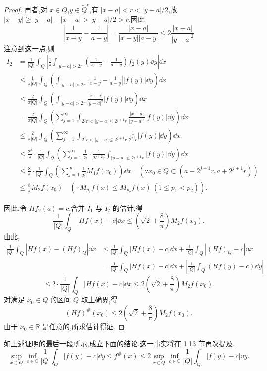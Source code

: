\begin{proof}
再者,对 $x \in Q$,$y \in \tilde{Q}^{c}$,有 $|x - a| < r < |y - a|/2$,故 $|x - y| \geq |y - a| - |x - a| > |y - a|/2 > r$.因此
\begin{equation*}
\left|\frac{1}{x - y} - \frac{1}{a - y}\right| = \frac{|x - a|}{|x - y||a - y|} \leq 2\frac{|x - a|}{|y - a|^{2}}
\end{equation*}
注意到这一点,则
\begin{align*}
I_{2} &= \frac{1}{|Q|}\int_{Q}\left|\frac{1}{\pi}\int_{|y - a| > 2r}\left(\frac{1}{x - y} - \frac{1}{a - y}\right)f_{2}(y)\dd y\right|\dd x \\
&\leq \frac{1}{\pi|Q|}\int_{Q}\left(\int_{|y - a| > 2r}\left|\frac{1}{x - y} - \frac{1}{a - y}\right||f(y)|\dd y\right)\dd x \\
&\leq \frac{2}{\pi|Q|}\int_{Q}\left(\int_{|y - a| > 2r}\frac{|x - a|}{|y - a|^{2}}|f(y)|\dd y\right)\dd x \\
&= \frac{2}{\pi|Q|}\int_{Q}\left(\sum_{j=1}^{\infty}\int_{2^{j}r < |y - a| \leq 2^{j+1}r}\frac{|x - a|}{|y - a|^{2}}|f(y)|\dd y\right)\dd x \\
&\leq \frac{2}{\pi|Q|}\int_{Q}\left(\sum_{j=1}^{\infty}\int_{2^{j}r < |y - a| \leq 2^{j+1}r}\frac{1}{2^{2j}r}|f(y)|\dd y\right)\dd x \\
&\leq \frac{2^{3}}{\pi}\cdot\frac{1}{|Q|}\int_{Q}\left(\sum_{j=1}^{\infty}\frac{1}{2^{j}}\cdot\frac{1}{2^{j+2}r}\int_{|y - a| \leq 2^{j+1}r}|f(y)|\dd y\right)\dd x \\
&\leq \frac{8}{\pi}\cdot\frac{1}{|Q|}\int_{Q}\left(\sum_{j=1}^{\infty}\frac{1}{2^{j}}M_{1}f(x_{0})\right)\dd x \quad (\because x_{0} \in Q \subset (a - 2^{j+1}r, a + 2^{j+1}r)) \\
&\leq \frac{8}{\pi}M_{2}f(x_{0}) \quad (\because M_{p_{1}}f(x) \leq M_{p_{2}}f(x) \ (1 \leq p_{1} < p_{2})).
\end{align*}

因此,令 $Hf_{2}(a) = c$,合并 $I_{1}$ 与 $I_{2}$ 的估计,得
\begin{equation*}
\frac{1}{|Q|}\int_{Q}|Hf(x) - c|\dd x \leq \left(\sqrt{2} + \frac{8}{\pi}\right)M_{2}f(x_{0}).
\end{equation*}
由此,
\begin{align*}
\frac{1}{|Q|}\int_{Q}|Hf(x) - (Hf)_{Q}|\dd x&\leq \frac{1}{|Q|}\int_{Q}|Hf(x) - c|\dd x + \frac{1}{|Q|}\int_{Q}|(Hf)_{Q} - c|\dd x  \\
&= \frac{1}{|Q|}\int_{Q}|Hf(x) - c|\dd x + \left|\frac{1}{|Q|}\int_{Q}(Hf(y) - c)\dd y\right|
\end{align*}
\begin{equation*}
\leq 2\cdot\frac{1}{|Q|}\int_{Q}|Hf(x) - c|\dd x \leq 2\left(\sqrt{2} + \frac{8}{\pi}\right)M_{2}f(x_{0}).
\end{equation*}
对满足 $x_{0} \in Q$ 的区间 $Q$ 取上确界,得
\begin{equation*}
(Hf)^{\#}(x_{0}) \leq 2\left(\sqrt{2} + \frac{8}{\pi}\right)M_{2}f(x_{0}).
\end{equation*}
由于 $x_{0} \in \mathbb{R}$ 是任意的,所求估计得证.
\end{proof}

\begin{note}\label{note:1.4.6}
如上述证明的最后一段所示,成立下面的结论.这一事实将在 1.13 节再次提及.
\begin{equation*}
\sup_{x \in Q}\inf_{c \in \mathbb{C}}\frac{1}{|Q|}\int_{Q}|f(y) - c|\dd y \leq f^{\#}(x) \leq 2\sup_{x \in Q}\inf_{c \in \mathbb{C}}\frac{1}{|Q|}\int_{Q}|f(y) - c|\dd y.
\end{equation*}
\end{note}
